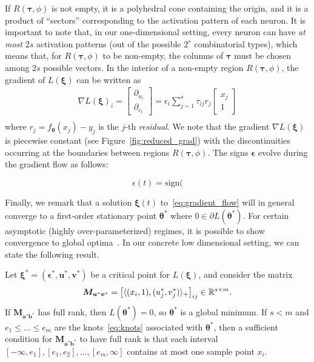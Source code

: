 If $R(\bm \tau, \phi)$ is not empty, it is a polyhedral cone containing the origin, and it is a product of ``sectors'' corresponding to the activation pattern of each neuron. It is important to note that, in our one-dimensional setting, every neuron can have \emph{at most} $2s$ activation patterns (out of the possible $2^s$ combinatorial types), which means that, for $R(\bm \tau, \phi)$ to be non-empty, the columns of $\bm \tau$ must be chosen among $2s$ possible vectors.
In the interior of a non-empty region $R(\bm \tau, \phi)$, the gradient of $L(\bm \xi)$ can be written as
\begin{equation}\label{eq:derivative_equations}
\begin{gathered}
\nabla L(\bm \xi)_i = \begin{bmatrix}\partial_{u_i} \\ \partial_{v_i}\end{bmatrix} = \epsilon_i \sum_{j=1}^s \tau_{ij} r_j \begin{bmatrix} x_j \\ 1\end{bmatrix}\\
\end{gathered}
\end{equation}
where $r_j = f_{\bm \theta}(x_j) - y_j$ is the $j$-th \emph{residual}. We note that the gradient $\nabla L(\bm \xi)$ is piecewise constant (see Figure~\ref{fig:reduced_grad}) with the discontinuities occurring at the boundaries between regions $R(\bm \tau, \phi)$. The signs $\bm \epsilon$ evolve during the gradient flow as follows:

\begin{equation}
    \epsilon(t) = \text{sign}(
\end{equation}

Finally, we remark that a solution $\bm \xi(t)$ to~\eqref{eq:gradient_flow} will in general converge to a first-order stationary point $\bm \theta^*$ where $0 \in \partial L(\bm \theta^*)$. For certain asymptotic (highly over-parameterized) regimes, it is possible to show convergence to global optima~\cite{du2018gradient,chizat2018global}. In our concrete low dimensional setting, we can state the following result.

\begin{proposition} Let $\bm \xi^* = (\bm \epsilon^*, \bm u^*, \bm v^*)$ be a critical point for $L(\bm \xi)$, and consider the matrix
\begin{equation}
    \bm M_{\bm u^* \bm v^*} = \big [ \langle (x_i, 1), (u_j^*, v_j^*) \rangle_+ \big ]_{ij} \in \mathbb{R}^{s \times m}.
\end{equation}
If $\bm M_{\bm a^* \bm b^*}$ has full rank, then $L(\bm \theta^*) = 0$, so $\bm \theta^*$ is a global minimum. If $s< m$ and $e_1 \le \ldots \le e_m$ are the knots~\eqref{eq:knots} associated with $\bm \theta^*$, then a sufficient condition for $\bm M_{\bm a^* \bm b^*}$ to have full rank is that each interval $[-\infty, e_1],[e_1,e_2],\ldots,[e_m,\infty]$ contains at most one sample point $x_i$.
\end{proposition}





